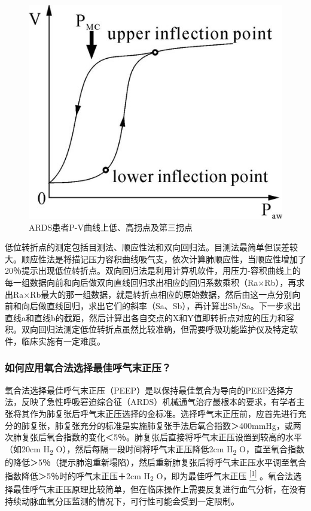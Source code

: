 \begin{figure}[!htbp]
 \centering
 \includegraphics{./images/Image00051.jpg}
 \captionsetup{justification=centering}
 \caption{ARDS患者P-V曲线上低、高拐点及第三拐点}
 \label{fig5-2}
  \end{figure} 

低位转折点的测定包括目测法、顺应性法和双向回归法。目测法最简单但误差较大。顺应性法是将描记压力容积曲线吸气支，依次计算肺顺应性，当顺应性增加了20％提示出现低位转折点。双向回归法是利用计算机软件，用压力-容积曲线上的每一组数据向前和向后做双向直线回归求出相应的回归系数乘积（Ra×Rb），再求出Ra×Rb最大的那一组数据，就是转折点相应的原始数据，然后由这一点分别向前和向后做直线回归，求出它们的斜率（Sa、Sb），再计算出Sb/Sa。下一步求出直线a和直线b的截距，然后计算出各自交点的X和Y值即转折点对应的压力和容积。双向回归法测定低位转折点虽然比较准确，但需要呼吸功能监护仪及特定软件，临床实施有一定难度。

\subsubsection{如何应用氧合法选择最佳呼气末正压？}

氧合法选择最佳呼气末正压（PEEP）是以保持最佳氧合为导向的PEEP选择方法，反映了急性呼吸窘迫综合征（ARDS）机械通气治疗最根本的要求，有学者主张将其作为肺复张后呼气末正压选择的金标准。选择呼气末正压前，应首先进行充分的肺复张，肺复张充分的标准是实施肺复张手法后氧合指数＞400mmHg，或两次肺复张后氧合指数的变化＜5％。肺复张后直接将呼气末正压设置到较高的水平（如20cm
H\textsubscript{2} O），然后每隔一段时间将呼气末正压降低2cm
H\textsubscript{2}
O，直至氧合指数的降低＞5％（提示肺泡重新塌陷），然后重新肺复张后将呼气末正压水平调至氧合指数降低＞5％时的呼气末正压＋2cm
H\textsubscript{2} O，即为最佳呼气末正压
\protect\hyperlink{text00011.htmlux5cux23ch1-10}{\textsuperscript{{[}1{]}}}
。氧合法选择最佳呼气末正压原理比较简单，但在临床操作上需要反复进行血气分析，在没有持续动脉血氧分压监测的情况下，可行性可能会受到一定限制。

